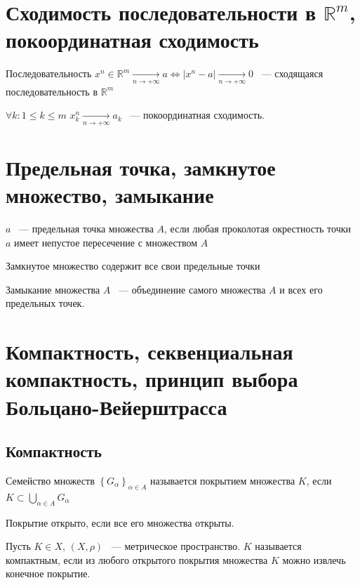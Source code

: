 \documentclass{article}
\begin{document}
    \newpage
    
    \section{Сходимость последовательности в $\mathbb{R}^m$, покоординатная сходимость}
    
        Последовательность $x^n \in \mathbb{R}^m \xrightarrow[n \rightarrow +\infty]{} a \Leftrightarrow | x^n - a | \xrightarrow[n \rightarrow +\infty]{} 0$ ~--- сходящаяся последовательность в $\mathbb{R}^m$
        
        $\forall k : 1 \leq k \leq m$ $x^n_k \xrightarrow[n \rightarrow +\infty]{} a_k$ ~--- покоординатная сходимость.
        
    \newpage
    
    \section{Предельная точка, замкнутое множество, замыкание}
    
        $a$ ~--- предельная точка множества $A$, если любая проколотая окрестность точки $a$ имеет непустое пересечение с множеством $A$
        
        Замкнутое множество содержит все свои предельные точки
        
        Замыкание множества $A$ ~--- объединение самого множества $A$ и всех его предельных точек.
        
    \newpage
    
    \section{Компактность, секвенциальная компактность, принцип выбора Больцано-Вейерштрасса}
    
        \subsection{Компактность}
            
            Семейство множеств $\left\{ G_{\alpha} \right\}_{\alpha \in A}$ называется покрытием множества $K$, если $K \subset \bigcup\limits_{\alpha \in A} G_{\alpha}$
        
            Покрытие открыто, если все его множества открыты.
        
            Пусть $K \in X$, $(X, \rho)$ ~--- метрическое пространство. $K$ называется компактным, если из любого открытого покрытия множества $K$ можно извлечь конечное покрытие. 
        
\end{document}
